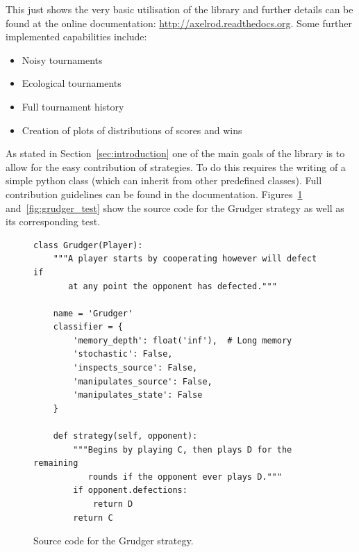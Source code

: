 \documentclass{article}
\begin{document}
This just shows the very basic utilisation of the library and further details
can be found at the online documentation:
\url{http://axelrod.readthedocs.org}. Some further implemented capabilities include:

\begin{itemize}
    \item Noisy tournaments
    \item Ecological tournaments
    \item Full tournament history
    \item Creation of plots of distributions of scores and wins
\end{itemize}

As stated in Section~\ref{sec:introduction} one of the main goals of the library
is to allow for the easy contribution of strategies. To do this requires the
writing of a simple python class (which can inherit from other predefined
classes). Full contribution guidelines can be found in the documentation.
Figures~\ref{fig:grudger} and~\ref{fig:grudger_test} show the source code for
the Grudger strategy as well as its corresponding test.

\begin{figure}[!hbtp]
    \begin{verbatim}
class Grudger(Player):
    """A player starts by cooperating however will defect if
       at any point the opponent has defected."""

    name = 'Grudger'
    classifier = {
        'memory_depth': float('inf'),  # Long memory
        'stochastic': False,
        'inspects_source': False,
        'manipulates_source': False,
        'manipulates_state': False
    }

    def strategy(self, opponent):
        """Begins by playing C, then plays D for the remaining
           rounds if the opponent ever plays D."""
        if opponent.defections:
            return D
        return C
    \end{verbatim}
    \caption{Source code for the Grudger strategy.}
    \label{fig:grudger}
\end{figure}
\end{document}
